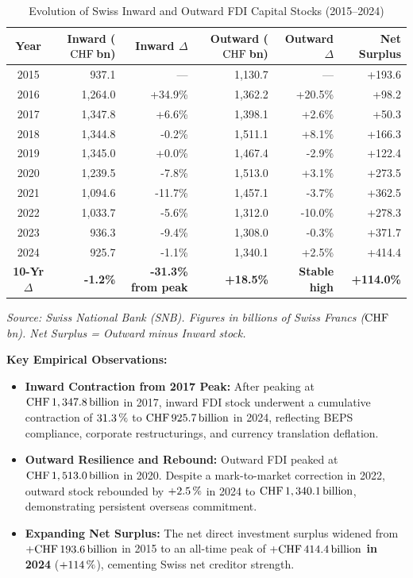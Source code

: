 \begin{table}[H]
\centering
\small
\caption{Evolution of Swiss Inward and Outward FDI Capital Stocks (2015--2024)}
\label{tab:combined_fdi_trends}
\setlength{\tabcolsep}{3.8pt}
\renewcommand{\arraystretch}{1.12}
\begin{tabular}{c r r r r r}
\toprule
\rowcolor{tableheadbg}
\textbf{Year} & \textbf{Inward ($\text{CHF}$\,bn)} & \textbf{Inward $\Delta$} & \textbf{Outward ($\text{CHF}$\,bn)} & \textbf{Outward $\Delta$} & \textbf{Net Surplus} \\
\midrule
2015 & 937.1 & --- & 1,130.7 & --- & +193.6 \\
\rowcolor{tablerowbg}
2016 & 1,264.0 & +34.9\% & 1,362.2 & +20.5\% & +98.2 \\
2017 & 1,347.8 & +6.6\% & 1,398.1 & +2.6\% & +50.3 \\
\rowcolor{tablerowbg}
2018 & 1,344.8 & -0.2\% & 1,511.1 & +8.1\% & +166.3 \\
2019 & 1,345.0 & +0.0\% & 1,467.4 & -2.9\% & +122.4 \\
\rowcolor{tablerowbg}
2020 & 1,239.5 & -7.8\% & 1,513.0 & +3.1\% & +273.5 \\
2021 & 1,094.6 & -11.7\% & 1,457.1 & -3.7\% & +362.5 \\
\rowcolor{tablerowbg}
2022 & 1,033.7 & -5.6\% & 1,312.0 & -10.0\% & +278.3 \\
2023 & 936.3 & -9.4\% & 1,308.0 & -0.3\% & +371.7 \\
\rowcolor{tablerowbg}
2024 & 925.7 & -1.1\% & 1,340.1 & +2.5\% & +414.4 \\
\midrule
\textbf{10-Yr $\Delta$} & \textbf{-1.2\%} & \textbf{-31.3\% from peak} & \textbf{+18.5\%} & \textbf{Stable high} & \textbf{+114.0\%} \\
\bottomrule
\end{tabular}
\par\vspace{0.3em}
\footnotesize
\textit{Source: Swiss National Bank (SNB). Figures in billions of Swiss Francs ($\text{CHF}\,$bn). Net Surplus = Outward minus Inward stock.}
\normalsize
\end{table}

\noindent\textbf{Key Empirical Observations:}
\begin{itemize}[leftmargin=1.5em, itemsep=1.5pt]
    \item \textbf{Inward Contraction from 2017 Peak:} After peaking at $\text{CHF}\,1,347.8\,\text{billion}$ in 2017, inward FDI stock underwent a cumulative contraction of \textbf{$31.3\,\%$} to $\text{CHF}\,925.7\,\text{billion}$ in 2024, reflecting BEPS compliance, corporate restructurings, and currency translation deflation.
    \item \textbf{Outward Resilience and Rebound:} Outward FDI peaked at $\text{CHF}\,1,513.0\,\text{billion}$ in 2020. Despite a mark-to-market correction in 2022, outward stock rebounded by $+2.5\,\%$ in 2024 to $\text{CHF}\,1,340.1\,\text{billion}$, demonstrating persistent overseas commitment.
    \item \textbf{Expanding Net Surplus:} The net direct investment surplus widened from $+\text{CHF}\,193.6\,\text{billion}$ in 2015 to an all-time peak of \textbf{$+\text{CHF}\,414.4\,\text{billion}$ in 2024} ($+114\,\%$), cementing Swiss net creditor strength.
\end{itemize}

